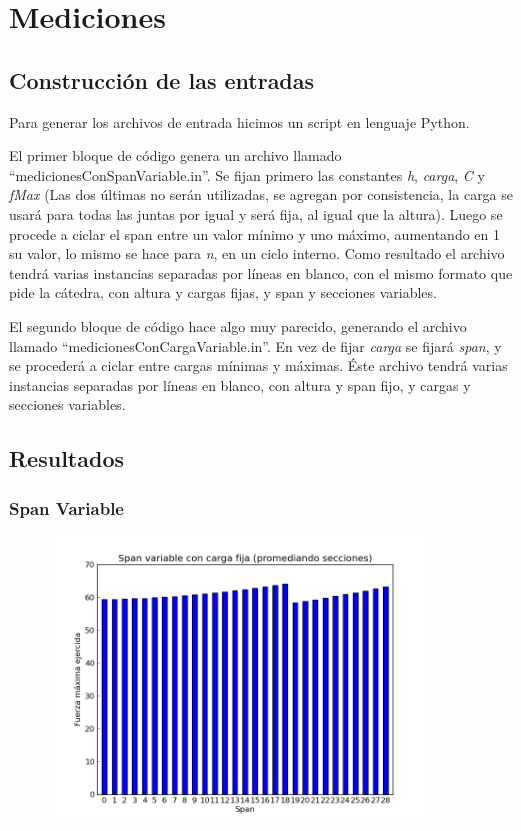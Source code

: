 \section{Mediciones}

\subsection{Construcción de las entradas}

Para generar los archivos de entrada hicimos un script en lenguaje Python.

El primer bloque de código genera un archivo llamado ``medicionesConSpanVariable.in''. Se fijan primero las constantes \emph{h}, \emph{carga}, \emph{C} y \emph{fMax}
(Las dos últimas no serán utilizadas, se agregan por consistencia, la carga se usará para todas las juntas por igual y será fija, al igual que la altura). 
Luego se procede a ciclar el span entre un valor mínimo y uno máximo, aumentando en 1 su valor, lo mismo se hace para \emph{n}, en un ciclo interno. 
Como resultado el archivo tendrá varias instancias separadas por líneas en blanco, con el mismo formato que pide la cátedra, con altura y cargas fijas, y span y secciones variables.

El segundo bloque de código hace algo muy parecido, generando el archivo llamado ``medicionesConCargaVariable.in''. En vez de fijar \emph{carga} se fijará \emph{span}, y se
procederá a ciclar entre cargas mínimas y máximas.
Éste archivo tendrá varias instancias separadas por líneas en blanco, con altura y span fijo, y cargas y secciones variables.


\subsection{Resultados}

\subsubsection{Span Variable}

\begin{figure}[H]
  \centering
    \includegraphics[width=0.9\textwidth]{../mediciones/spanVariable.png}
    \caption{}
\end{figure}



